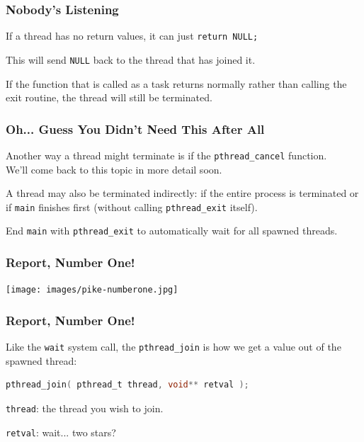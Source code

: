 \begin{frame}
	\frametitle{Nobody's Listening}

	If a thread has no return values, it can just \texttt{return NULL;}

	This will send \texttt{NULL} back to the thread that has joined it.

	If the function that is called as a task returns normally rather than calling the exit routine, the thread will still be terminated.

\end{frame}

\begin{frame}
	\frametitle{Oh... Guess You Didn't Need This After All}

	Another way a thread might terminate is if the \texttt{pthread\_cancel} function.\\
	\quad We'll come back to this topic in more detail soon.

	A thread may also be terminated indirectly: if the entire process is terminated or if \texttt{main} finishes first (without calling \texttt{pthread\_exit} itself).

	End \texttt{main} with \texttt{pthread\_exit} to automatically wait for all spawned threads.

\end{frame}


\begin{frame}
\frametitle{Report, Number One!}

\begin{center}
	\texttt{[image: images/pike-numberone.jpg]}
\end{center}

\end{frame}


\begin{frame}[fragile]
	\frametitle{Report, Number One!}

	Like the \texttt{wait} system call, the \texttt{pthread\_join} is how we get a value out of the spawned thread:

	\begin{lstlisting}[language=C]
pthread_join( pthread_t thread, void** retval );
\end{lstlisting}

	\texttt{thread}: the thread you wish to join.

	\texttt{retval}: wait... two stars?

\end{frame}


